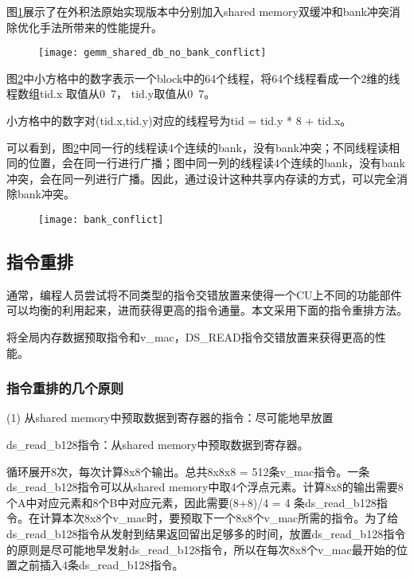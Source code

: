 图\ref{fig:gemm_shared_db_no_bank_conflict}展示了在外积法原始实现版本中分别加入shared memory双缓冲和bank冲突消除优化手法所带来的性能提升。
\begin{figure}[htbp]
	\centering
	\texttt{[image: gemm\_shared\_db\_no\_bank\_conflict]}
	\label{fig:gemm_shared_db_no_bank_conflict}
\end{figure}


图\ref{fig:bank_conflict}中小方格中的数字表示一个block中的64个线程，将64个线程看成一个2维的线程数组tid.x 取值从0~7， tid.y取值从0~7。

小方格中的数字对(tid.x,tid.y)对应的线程号为tid = tid.y * 8 + tid.x。

可以看到，图\ref{fig:bank_conflict}中同一行的线程读4个连续的bank，没有bank冲突；不同线程读相同的位置，会在同一行进行广播；图中同一列的线程读4个连续的bank，没有bank冲突，会在同一列进行广播。因此，通过设计这种共享内存读的方式，可以完全消除bank冲突。
\begin{figure}[htbp]
	\centering
	\texttt{[image: bank\_conflict]}
	\label{fig:bank_conflict}
\end{figure}


\subsection{指令重排}
通常，编程人员尝试将不同类型的指令交错放置来使得一个CU上不同的功能部件可以均衡的利用起来，进而获得更高的指令通量。本文采用下面的指令重排方法。

将全局内存数据预取指令和v\_mac，DS\_READ指令交错放置来获得更高的性能。

\subsubsection{指令重排的几个原则}
(1) 从shared memory中预取数据到寄存器的指令：尽可能地早放置

ds\_read\_b128指令：从shared memory中预取数据到寄存器。

循环展开8次，每次计算8x8个输出。总共8x8x8 = 512条v\_mac指令。一条ds\_read\_b128指令可以从shared memory中取4个浮点元素。计算8x8的输出需要8个A中对应元素和8个B中对应元素，因此需要(8+8)/4 = 4 条ds\_read\_b128指令。在计算本次8x8个v\_mac时，要预取下一个8x8个v\_mac所需的指令。为了给ds\_read\_b128指令从发射到结果返回留出足够多的时间，放置ds\_read\_b128指令的原则是尽可能地早发射ds\_read\_b128指令，所以在每次8x8个v\_mac最开始的位置之前插入4条ds\_read\_b128指令。

